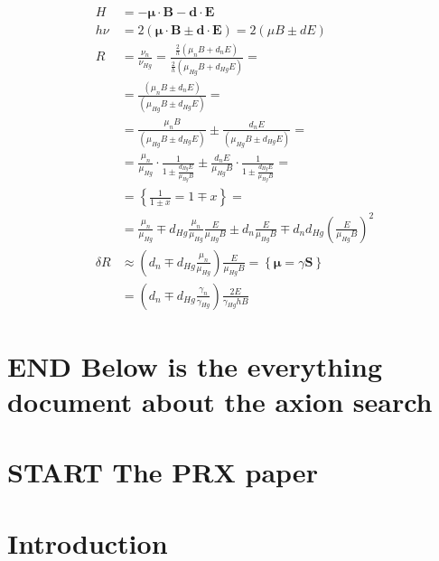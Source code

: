 \begin{align}
H &= - \boldsymbol{\mu} \cdot \mathbf{B} - \mathbf{d} \cdot \mathbf{E} \\
h \nu &= 2 \left( \boldsymbol{\mu} \cdot \mathbf{B} \pm \mathbf{d} \cdot \mathbf{E} \right) = 2 \left(\mu B \pm d E \right) \\
R &= \frac{\nu_n}{\nu_{Hg}} = \frac{ \frac{2}{h} \left( \mu_n B + d_n E \right) }{ \frac{2}{h} \left( \mu_{Hg} B + d_{Hg} E \right) } = \nonumber \\
    &= \frac{ \left( \mu_n B \pm d_n E \right) }{ \left( \mu_{Hg} B \pm d_{Hg} E \right) } = \nonumber \\
    &= \frac{ \mu_n B }{ \left( \mu_{Hg} B \pm d_{Hg} E \right) } \pm \frac{ d_n E }{ \left( \mu_{Hg} B \pm d_{Hg} E \right) } = \nonumber \\
    &= \frac{\mu_n}{\mu_{Hg}} \cdot \frac{1}{ 1 \pm \frac{d_{Hg} E}{\mu_{Hg} B}} \pm \frac{d_n E}{\mu_{Hg} B} \cdot \frac{1}{1 \pm \frac{ d_{Hg}E }{ \mu_{Hg} B}} = \nonumber \\
    &= \left\{ \frac{1}{1 \pm x} = 1 \mp x \right\} = \nonumber \\
    &= \frac{\mu_n}{\mu_{Hg}} \mp d_{Hg} \frac{\mu_n}{\mu_{Hg}} \frac{E}{\mu_{Hg} B} \pm d_n \frac{E}{\mu_{Hg} B} \mp d_n d_{Hg} \left( \frac{E}{\mu_{Hg} B} \right)^2 \\
\delta R &\approx \left( d_n \mp  d_{Hg} \frac{\mu_n}{\mu_{Hg}} \right) \frac{E}{\mu_{Hg} B} = \left\{ \boldsymbol{\mu} = \gamma \mathbf{S} \right\} \nonumber \\
   & = \left( d_n \mp  d_{Hg} \frac{\gamma_n}{\gamma_{Hg}} \right) \frac{2 E}{\gamma_{Hg} h B}
\end{align}


\section{END Below is the everything document about the axion search}





\section{START The PRX paper}


\section{Introduction}
\label{Sec:Introduction}

